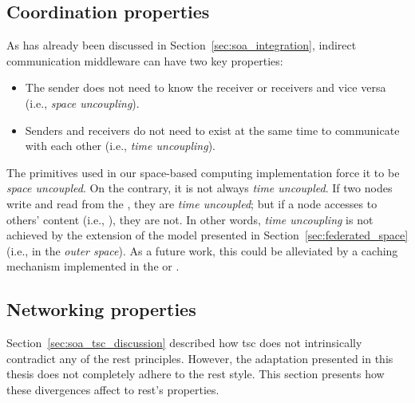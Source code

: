 \subsection{Coordination properties}
\label{sec:coordination_properties}

As has already been discussed in Section~\ref{sec:soa_integration}, indirect communication middleware can have two key properties:
\begin{itemize}
  \item The sender does not need to know the receiver or receivers and vice versa (i.e., \emph{space uncoupling}).
  \item Senders and receivers do not need to exist at the same time to communicate with each other (i.e., \emph{time uncoupling}).
\end{itemize}


The primitives used in our space-based computing implementation force it to be \emph{space uncoupled}.
On the contrary, it is not always \emph{time uncoupled}.
If two nodes write and read from the \coordspace{}, they are \emph{time uncoupled};
but if a node accesses to others' content (i.e., \selfgraphs{}), they are not.
In other words, \emph{time uncoupling} is not achieved by the extension of the model presented in Section~\ref{sec:federated_space} (i.e., in the \emph{outer space}).
As a future work, this could be alleviated by a caching mechanism implemented in the \coordinator{} or \coordinators{}. %




\subsection{Networking properties} %
\label{sec:network_properties}

Section~\ref{sec:soa_tsc_discussion} described how \ac{tsc} does not intrinsically contradict any of the \ac{rest} principles.
However, the adaptation presented in this thesis does not completely adhere to the \ac{rest} style.
This section presents how these divergences affect to \ac{rest}'s properties.


